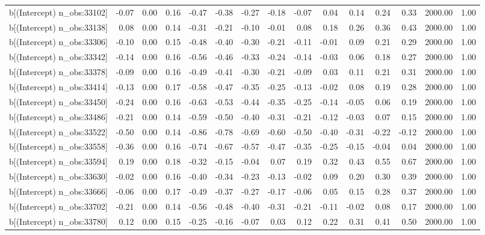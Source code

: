 \begin{table}[ht]
\begin{tabular}{rrrrrrrrrrrrrrr}
  b[(Intercept) n\_obs:33102] & -0.07 & 0.00 & 0.16 & -0.47 & -0.38 & -0.27 & -0.18 & -0.07 & 0.04 & 0.14 & 0.24 & 0.33 & 2000.00 & 1.00 \\ 
  b[(Intercept) n\_obs:33138] & 0.08 & 0.00 & 0.14 & -0.31 & -0.21 & -0.10 & -0.01 & 0.08 & 0.18 & 0.26 & 0.36 & 0.43 & 2000.00 & 1.00 \\ 
  b[(Intercept) n\_obs:33306] & -0.10 & 0.00 & 0.15 & -0.48 & -0.40 & -0.30 & -0.21 & -0.11 & -0.01 & 0.09 & 0.21 & 0.29 & 2000.00 & 1.00 \\ 
  b[(Intercept) n\_obs:33342] & -0.14 & 0.00 & 0.16 & -0.56 & -0.46 & -0.33 & -0.24 & -0.14 & -0.03 & 0.06 & 0.18 & 0.27 & 2000.00 & 1.00 \\ 
  b[(Intercept) n\_obs:33378] & -0.09 & 0.00 & 0.16 & -0.49 & -0.41 & -0.30 & -0.21 & -0.09 & 0.03 & 0.11 & 0.21 & 0.31 & 2000.00 & 1.00 \\ 
  b[(Intercept) n\_obs:33414] & -0.13 & 0.00 & 0.17 & -0.58 & -0.47 & -0.35 & -0.25 & -0.13 & -0.02 & 0.08 & 0.19 & 0.28 & 2000.00 & 1.00 \\ 
  b[(Intercept) n\_obs:33450] & -0.24 & 0.00 & 0.16 & -0.63 & -0.53 & -0.44 & -0.35 & -0.25 & -0.14 & -0.05 & 0.06 & 0.19 & 2000.00 & 1.00 \\ 
  b[(Intercept) n\_obs:33486] & -0.21 & 0.00 & 0.14 & -0.59 & -0.50 & -0.40 & -0.31 & -0.21 & -0.12 & -0.03 & 0.07 & 0.15 & 2000.00 & 1.00 \\ 
  b[(Intercept) n\_obs:33522] & -0.50 & 0.00 & 0.14 & -0.86 & -0.78 & -0.69 & -0.60 & -0.50 & -0.40 & -0.31 & -0.22 & -0.12 & 2000.00 & 1.00 \\ 
  b[(Intercept) n\_obs:33558] & -0.36 & 0.00 & 0.16 & -0.74 & -0.67 & -0.57 & -0.47 & -0.35 & -0.25 & -0.15 & -0.04 & 0.04 & 2000.00 & 1.00 \\ 
  b[(Intercept) n\_obs:33594] & 0.19 & 0.00 & 0.18 & -0.32 & -0.15 & -0.04 & 0.07 & 0.19 & 0.32 & 0.43 & 0.55 & 0.67 & 2000.00 & 1.00 \\ 
  b[(Intercept) n\_obs:33630] & -0.02 & 0.00 & 0.16 & -0.40 & -0.34 & -0.23 & -0.13 & -0.02 & 0.09 & 0.20 & 0.30 & 0.39 & 2000.00 & 1.00 \\ 
  b[(Intercept) n\_obs:33666] & -0.06 & 0.00 & 0.17 & -0.49 & -0.37 & -0.27 & -0.17 & -0.06 & 0.05 & 0.15 & 0.28 & 0.37 & 2000.00 & 1.00 \\ 
  b[(Intercept) n\_obs:33702] & -0.21 & 0.00 & 0.14 & -0.56 & -0.48 & -0.40 & -0.31 & -0.21 & -0.11 & -0.02 & 0.08 & 0.17 & 2000.00 & 1.00 \\ 
  b[(Intercept) n\_obs:33780] & 0.12 & 0.00 & 0.15 & -0.25 & -0.16 & -0.07 & 0.03 & 0.12 & 0.22 & 0.31 & 0.41 & 0.50 & 2000.00 & 1.00 \\ 

\end{tabular}
\end{table}
